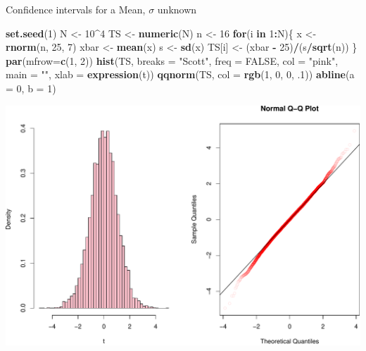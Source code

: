 \documentclass[
  ignorenonframetext,
]{beamer}
\newenvironment{Shaded}{\begin{snugshade}}{\end{snugshade}}
\newcommand{\AttributeTok}[1]{\textcolor[rgb]{0.13,0.29,0.53}{#1}}
\newcommand{\ConstantTok}[1]{\textcolor[rgb]{0.56,0.35,0.01}{#1}}
\newcommand{\ControlFlowTok}[1]{\textcolor[rgb]{0.13,0.29,0.53}{\textbf{#1}}}
\newcommand{\DecValTok}[1]{\textcolor[rgb]{0.00,0.00,0.81}{#1}}
\newcommand{\FunctionTok}[1]{\textcolor[rgb]{0.13,0.29,0.53}{\textbf{#1}}}
\newcommand{\NormalTok}[1]{#1}
\newcommand{\OtherTok}[1]{\textcolor[rgb]{0.56,0.35,0.01}{#1}}
\newcommand{\SpecialCharTok}[1]{\textcolor[rgb]{0.81,0.36,0.00}{\textbf{#1}}}
\newcommand{\StringTok}[1]{\textcolor[rgb]{0.31,0.60,0.02}{#1}}
\begin{document}
\begin{frame}[fragile]{Confidence intervals for a Mean, \(\sigma\)
unknown}
\protect\hypertarget{confidence-intervals-for-a-mean-sigma-unknown-1}{}
\tiny

\begin{Shaded}
\begin{Highlighting}[]
\FunctionTok{set.seed}\NormalTok{(}\DecValTok{1}\NormalTok{)}
\NormalTok{N }\OtherTok{\textless{}{-}} \DecValTok{10}\SpecialCharTok{\^{}}\DecValTok{4}
\NormalTok{TS }\OtherTok{\textless{}{-}} \FunctionTok{numeric}\NormalTok{(N)}
\NormalTok{n }\OtherTok{\textless{}{-}} \DecValTok{16}
\ControlFlowTok{for}\NormalTok{(i }\ControlFlowTok{in} \DecValTok{1}\SpecialCharTok{:}\NormalTok{N)\{}
\NormalTok{  x }\OtherTok{\textless{}{-}} \FunctionTok{rnorm}\NormalTok{(n, }\DecValTok{25}\NormalTok{, }\DecValTok{7}\NormalTok{)}
\NormalTok{  xbar }\OtherTok{\textless{}{-}} \FunctionTok{mean}\NormalTok{(x)}
\NormalTok{  s }\OtherTok{\textless{}{-}} \FunctionTok{sd}\NormalTok{(x)}
\NormalTok{  TS[i] }\OtherTok{\textless{}{-}}\NormalTok{ (xbar }\SpecialCharTok{{-}} \DecValTok{25}\NormalTok{)}\SpecialCharTok{/}\NormalTok{(s}\SpecialCharTok{/}\FunctionTok{sqrt}\NormalTok{(n))}
\NormalTok{\}}
\FunctionTok{par}\NormalTok{(}\AttributeTok{mfrow=}\FunctionTok{c}\NormalTok{(}\DecValTok{1}\NormalTok{, }\DecValTok{2}\NormalTok{))}
\FunctionTok{hist}\NormalTok{(TS, }\AttributeTok{breaks =} \StringTok{"Scott"}\NormalTok{, }\AttributeTok{freq =} \ConstantTok{FALSE}\NormalTok{, }\AttributeTok{col =} \StringTok{"pink"}\NormalTok{, }\AttributeTok{main =} \StringTok{""}\NormalTok{, }\AttributeTok{xlab =} \FunctionTok{expression}\NormalTok{(t))}
\FunctionTok{qqnorm}\NormalTok{(TS, }\AttributeTok{col =} \FunctionTok{rgb}\NormalTok{(}\DecValTok{1}\NormalTok{, }\DecValTok{0}\NormalTok{, }\DecValTok{0}\NormalTok{, .}\DecValTok{1}\NormalTok{))}
\FunctionTok{abline}\NormalTok{(}\AttributeTok{a =} \DecValTok{0}\NormalTok{, }\AttributeTok{b =} \DecValTok{1}\NormalTok{)}
\end{Highlighting}
\end{Shaded}

\begin{center}\includegraphics[width=0.6\linewidth,height=0.4\textheight]{Week10_Lect_files/figure-beamer/unnamed-chunk-54-1} \end{center}
\normalsize
\end{frame}
\end{document}
